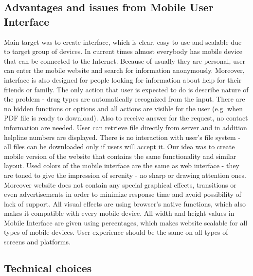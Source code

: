 \documentclass[a4paper,12pt, twocolumn]{article}
\begin{document}
\subsection*{Advantages and issues from Mobile User Interface}

Main target was to create interface, which is clear, easy to use and scalable due to target group of devices. In current times almost everybody has mobile device that can be connected to the Internet. Because of usually they are personal, user can enter the mobile website and search for information anonymously. Moreover, interface is also designed for people looking for information about help for their friends or family. The only action that user is expected to do is describe nature of the problem - drug types are automatically recognized from the input. There are no hidden functions or options and all actions are visible for the user (e.g. when PDF file is ready to download). Also to receive answer for the request, no contact information are needed. User can retrieve file directly from server and in addition helpline numbers are displayed. There is no interaction with user's file system - all files can be downloaded only if users will accept it. 
Our idea was to create mobile version of the website that contains the same functionality and similar layout. Used colors of the mobile interface are the same as web interface - they are toned to give the impression of serenity - no sharp or drawing attention ones. Moreover website does not contain any special graphical effects, transitions or even advertisements in order to minimize response time and avoid possibility of lack of support. All visual effects are using browser's native functions, which also makes it compatible with every mobile device. All width and height values in Mobile Interface are given using percentages, which makes website scalable for all types of mobile devices. User experience should be the same on all types of screens and platforms. 


\subsection*{Technical choices}
\end{document}
